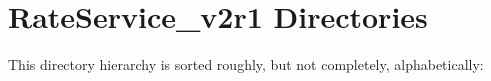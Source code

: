 \section{Rate\-Service\_\-v2r1 Directories}
This directory hierarchy is sorted roughly, but not completely, alphabetically:\begin{CompactList}
\item {}
\end{CompactList}
